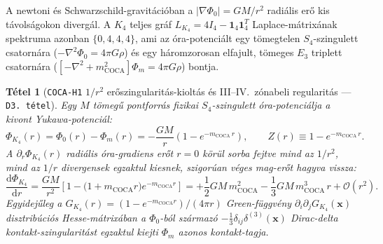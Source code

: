\documentclass[11pt,a4paper]{article}
\newtheorem{theorem}{T\'etel}[section]
\theoremstyle{remark}
\begin{document}
A newtoni \'es Schwarzschild-gravit\'aci\'oban a $|\nabla\Phi_0| = GM/r^2$ radi\'alis er\H{o} kis t\'avols\'agokon diverg\'al. A $K_4$ teljes gr\'af $L_{K_4} = 4I_4 - \mathbf{1}_4\mathbf{1}_4^T$ Laplace-m\'atrix\'anak spektruma azonban $\{0, 4, 4, 4\}$, ami az \'ora-potenci\'alt egy t\"omegtelen $S_4$-szingulett csatorn\'ara ($-\nabla^2\Phi_0 = 4\pi G\rho$) \'es egy h\'aromzorosan elfajult, t\"omeges $E_3$ triplett csatorn\'ara ($[-\nabla^2 + m_{\mathrm{COCA}}^2]\Phi_m = 4\pi G\rho$) bontja.

\begin{theorem}[\texttt{COCA-H1} $1/r^2$ er\H{o}szingularit\'as-kiolt\'as \'es III--IV.\ z\'onabeli regularit\'as --- \texttt{D3.\ t\'etel}]
\label{thm:d3}
Egy $M$ t\"omeg\H{u} pontforr\'as fizikai $S_4$-szingulett \'ora-potenci\'alja a kivont Yukawa-potenci\'al:
\begin{equation}
  \Phi_{K_4}(r) = \Phi_0(r) - \Phi_m(r) = -\frac{GM}{r}\!\left(1 - e^{-m_{\mathrm{COCA}}\,r}\right), \qquad Z(r) \equiv 1 - e^{-m_{\mathrm{COCA}}\,r}.
  \label{eq:phi_k4_yukawa}
\end{equation}
A $\partial_r\Phi_{K_4}(r)$ radi\'alis \'ora-gradiens er\H{o}t $r = 0$ k\"or\"ul sorba fejtve mind az $1/r^2$, mind az $1/r$ divergensek egzaktul kiesnek, szigor\'uan v\'eges mag-er\H{o}t hagyva vissza:
\begin{equation}
  \frac{\mathrm{d}\Phi_{K_4}}{\mathrm{d}r} = \frac{GM}{r^2}\!\left[1 - \bigl(1 + m_{\mathrm{COCA}}r\bigr)e^{-m_{\mathrm{COCA}}r}\right] = +\frac{1}{2}GM\,m_{\mathrm{COCA}}^2 - \frac{1}{3}GM\,m_{\mathrm{COCA}}^3\,r + \mathcal{O}(r^2).
  \label{eq:coca_finite_force}
\end{equation}
Egyidej\H{u}leg a $G_{K_4}(r) = (1 - e^{-m_{\mathrm{COCA}}r})/(4\pi r)$ Green-f\"uggv\'eny $\partial_i\partial_j G_{K_4}(\mathbf{x})$ disztrib\'uci\'os Hesse-m\'atrix\'aban a $\Phi_0$-b\'ol sz\'armaz\'o $-\frac{1}{3}\delta_{ij}\delta^{(3)}(\mathbf{x})$ Dirac-delta kontakt-szingularit\'ast egzaktul kiejti $\Phi_m$ azonos kontakt-tagja.
\end{theorem}
\end{document}
